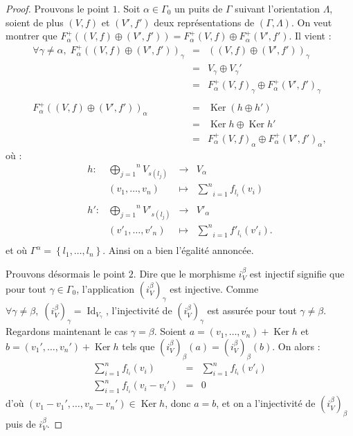 \documentclass[a4paper,10pt]{article}
\DeclareMathOperator{\Ker}{Ker}
\DeclareMathOperator{\Id}{Id}
\begin{document}
\begin{proof}
	Prouvons le point $1$. Soit $\alpha\in\Gamma_{0}$ un puits de $\Gamma$ suivant l'orientation $\Lambda$, soient de plus $(V,f)$ et $(V',f')$ deux représentations de $(\Gamma,\Lambda)$. On veut montrer que $F_{\alpha}^{+}((V,f)\oplus(V',f'))=F_{\alpha}^{+}(V,f)\oplus F_{\alpha}^{+}(V',f')$. Il vient :
	\[
\begin{array}{rll}
	\forall\gamma\neq\alpha,\;F_{\alpha}^{+}((V,f)\oplus(V',f'))_{\gamma}&=&((V,f)\oplus(V',f'))_{\gamma}\\
	&=& V_{\gamma}\oplus V_{\gamma}'\\
	&=&  F_{\alpha}^{+}(V,f)_{\gamma}\oplus F_{\alpha}^{+}(V',f')_{\gamma}\\
	&&\\
	F_{\alpha}^{+}((V,f)\oplus(V',f'))_{\alpha}&=&\Ker(h\oplus h')\\
	&=& \Ker h \oplus \Ker h'\\
	&=&  F_{\alpha}^{+}(V,f)_{\alpha}\oplus F_{\alpha}^{+}(V',f')_{\alpha},
\end{array}
	\]
où :
\[
\begin{array}{lccc}
	h : & \overset{n}{\underset{j=1}{\bigoplus}}V_{s(l_{j})}&\rightarrow & V_{\alpha} \\ 
	& (v_{1},\dots,v_{n})&\mapsto & \underset{i=1}{\overset{n}{\sum}}f_{l_{i}}(v_{i})\\
	&&&\\
	h' : & \overset{n}{\underset{j=1}{\bigoplus}}V'_{s(l_{j})}&\rightarrow & V'_{\alpha} \\ 
	& (v'_{1},\dots,v'_{n})&\mapsto & \underset{i=1}{\overset{n}{\sum}}f'_{l_{i}}(v'_{i}).\\
\end{array}
	\]
	et où $\Gamma^{\alpha}=\left\{ l_{1},\dots,l_{n} \right\}$. Ainsi on a bien l'égalité annoncée.

	Prouvons désormais le point $2$. Dire que le morphisme $i_{V}^{\beta}$ est injectif signifie que pour tout $\gamma\in\Gamma_{0}$, l'application $(i_{V}^{\beta})_{\gamma}$ est injective. Comme $\forall\gamma\neq\beta,\;(i_{V}^{\beta})_{\gamma}=\Id_{V_{\gamma}}$, l'injectivité de $(i_{V}^{\beta})_{\gamma}$ est assurée pour tout $\gamma\neq\beta$. Regardons maintenant le cas $\gamma=\beta$. Soient $a=(v_{1},\dots,v_{n})+\Ker h$ et $b=(v_{1}',\dots,v_{n}')+\Ker h$ tels que $(i_{V}^{\beta})_{\beta}(a)=(i_{V}^{\beta})_{\beta}(b)$. On alors :
	\[
\begin{array}{rll}
	\sum_{i=1}^{n}f_{l_{i}}(v_{i})&=&\sum_{i=1}^{n}f_{l_{i}}(v'_{i})\\
	\sum_{i=1}^{n}f_{l_{i}}(v_{i}-v_{i}')&=&0
\end{array}
	\]
	d'où $(v_{1}-v_{1}',\dots,v_{n}-v_{n}')\in\Ker h$, donc $a=b$, et on a l'injectivité de $(i_{V}^{\beta})_{\beta}$ puis de $i_{V}^{\beta}$.


\end{proof}
\end{document}
